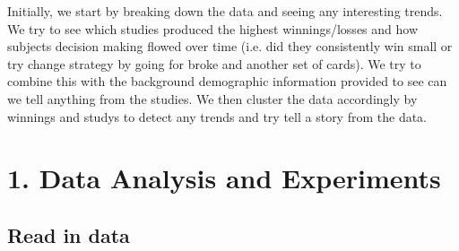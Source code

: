 \documentclass[letterpaper,10pt,english]{jupyterBook}
\begin{document}
\sphinxAtStartPar
Initially, we start by breaking down the data and seeing any interesting trends. We try to see which studies produced the highest winnings/losses and how subjects decision making flowed over time (i.e. did they consistently win small or try change strategy by going for broke and another set of cards). We try to combine this with the background demographic information provided to see can we tell anything from the studies. We then cluster the data accordingly by winnings and studys to detect any trends and try tell a story from the data.


\chapter{1. Data Analysis and Experiments}
\label{\detokenize{data-analysis:data-analysis-and-experiments}}\label{\detokenize{data-analysis::doc}}

\section{Read in data}
\label{\detokenize{data-analysis:read-in-data}}
\begin{sphinxVerbatim}[commandchars=\\\{\}]
   
   
   
   
\end{sphinxVerbatim}

\begin{sphinxVerbatim}[commandchars=\\\{\}]
  
\end{sphinxVerbatim}
\end{document}
